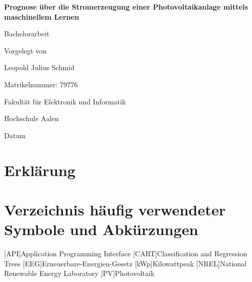 \documentclass[12pt, a4paper]{article}
\begin{document}
\begin{titlepage}
    \begin{center}
        \vspace*{1cm}
        
        \textbf{\LARGE{Prognose über die Stromerzeugung einer Photovoltaikanlage mittels maschinellem Lernen}}
        
        \vspace{0.5cm}
        \Large{Bachelorarbeit}
        
        \vspace{1.5cm}
        \Large{Vorgelegt von}
        
        \vspace{0.5cm}
        \Large{Leopold Julius Schmid}
        
        \vspace{1.5cm}
        \Large{Matrikelnummer: 79776}
        
        \vfill
        
        \Large{Fakultät für Elektronik und Informatik}
        
        \vspace{0.5cm}
        \Large{Hochschule Aalen}
        
        \vspace{1.5cm}
        \Large{Datum}
        
    \end{center}
\end{titlepage}


\newpage

\section*{Erklärung}


\newpage


\section*{Verzeichnis häufig verwendeter Symbole und Abkürzungen}

\begin{acronym}
[API]{Application Programming Interface}
[CART]{Classification and Regression Trees}
[EEG]{Erneuerbare-Energien-Gesetz}
[kWp]{Kilowattpeak}
[NREL]{National Renewable Energy Laboratory}
[PV]{Photovoltaik}
\end{acronym}

\newpage
\end{document}
